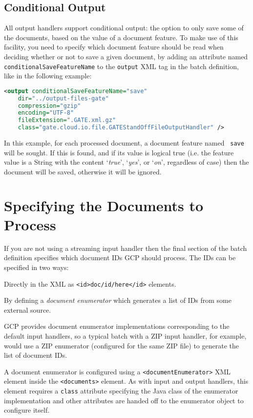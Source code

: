 \subsection{Conditional Output}\label{sec:batch-def:conditional-output}
All output handlers support conditional output: the option to only save
some of the documents, based on the value of a document feature. To make use of
this facility, you need to specify which document feature should be read when
deciding whether or not to save a given document, by adding an attribute named
\verb!conditionalSaveFeatureName! to the \verb!output! XML tag in the batch
definition, like in the following example:

\begin{lstlisting}[language=XML]
<output conditionalSaveFeatureName="save"
    dir="../output-files-gate"
    compression="gzip"
    encoding="UTF-8"
    fileExtension=".GATE.xml.gz"
    class="gate.cloud.io.file.GATEStandOffFileOutputHandler" />
\end{lstlisting}

In this example, for each processed document, a document feature named {\tt
save} will be sought. If this is found, and if its value is logical true (i.e.
the feature value is a String with the content `{\it true}', `{\it yes}', or
`{\it on}', regardless of case) then the document will be saved, otherwise it
will be ignored.

\section{Specifying the Documents to Process}

If you are not using a streaming input handler then the final section of the
batch definition specifies which document IDs GCP should process.  The IDs can
be specified in two ways:

\bit
\item Directly in the XML as \verb!<id>doc/id/here</id>! elements.
\item By defining a {\em document enumerator} which generates a list of IDs
  from some external source.
\eit

GCP provides document enumerator implementations corresponding to the default
input handlers, so a typical batch with a ZIP input handler, for example, would
use a ZIP enumerator (configured for the same ZIP file) to generate the list of
document IDs.

A document enumerator is configured using a \verb!<documentEnumerator>! XML
element inside the \verb!<documents>! element.  As with input and output
handlers, this element requires a \verb!class! attribute specifying the Java
class of the enumerator implementation and other attributes are handed off to
the enumerator object to configure itself.

